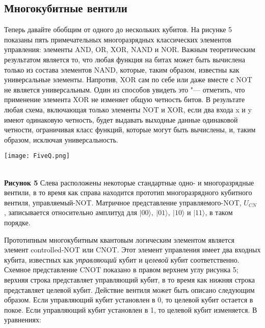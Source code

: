 \begin{multicols}{2}
    \section*{Многокубитные вентили}
    \normalsize{
        Теперь давайте обобщим от одного до нескольких кубитов. На рисунке 5 показаны пять примечательных
        многоразрядных классических элементов управления: элементы AND, OR, XOR, NAND и NOR. Важным
        теоретическим результатом является то, что любая функция на битах может быть вычислена только из состава элементов
        NAND, которые, таким образом, известны как универсальные элементы. Напротив, XOR сам по себе или
        даже вместе с NOT не является универсальным. Один из способов увидеть это "--- отметить, что применение
        элемента XOR не изменяет общую четность битов. В результате любая схема, включающая
        только элементы NOT и XOR, если два входа x и y имеют одинаковую четность, будет выдавать выходные
        данные одинаковой четности, ограничивая класс функций, которые могут быть вычислены, и, таким образом, исключая универсальность.
    }\\
    \begin{flushleft}
        \begin{minipage}{0.3\textwidth}{\texttt{[image: FiveQ.png]}}
        \end{minipage}\\
        \vspace{0.3cm}
        \footnotesize{\textbf{Рисунок 5} Слева расположены некоторые стандартные одно- и многоразрядные вентили, в то время как справа находится прототип
        многоразрядного кубитного вентиля, управляемый-NOT. Матричное представление управляемого-NOT, $U_{CN}$ , записывается
        относительно амплитуд для $\vert00\rangle,~\vert01\rangle,~\vert10\rangle$ и $\vert11\rangle$, в таком порядке.}
    \end{flushleft}
    \normalsize{
        Прототипным многокубитным квантовым логическим элементом является элемент controlled-NOT или CNOT.
        Этот элемент управления имеет два входных кубита, известных как \emph{управляющий} кубит и \emph{целевой} кубит соответственно. Схемное представление CNOT показано в правом верхнем углу рисунка 5;
        верхняя строка представляет управляющий кубит, в то время как нижняя строка представляет целевой кубит. Действие вентиля может быть описано следующим образом. Если управляющий кубит установлен в
        0, то целевой кубит остается в покое. Если управляющий кубит установлен в 1, то целевой кубит изменяется. В уравнениях:
}
\end{multicols}
